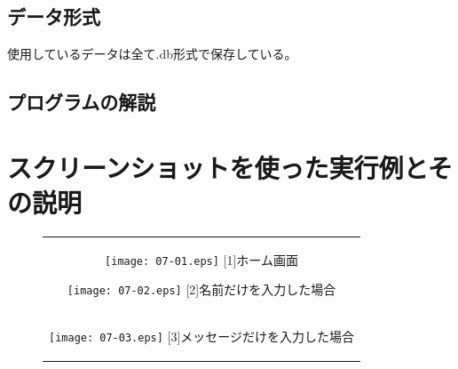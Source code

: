 \documentclass[12pt,a4paper]{jarticle}
\begin{document}
\begin{ttfamily}
\subsection{データ形式}
使用しているデータは全て.db形式で保存している。
\subsection{プログラムの解説}
\subsubsection{}
\subsubsection{}
\subsubsection{}


\section{スクリーンショットを使った実行例とその説明}
\begin{figure}[htbp]
  \begin{center}
    \begin{tabular}{c}

      \begin{minipage}{0.53\hsize}
        \begin{center}
          \texttt{[image: 07-01.eps]}
          \hspace{1.6cm} [1]ホーム画面
        \end{center}
      \end{minipage}

      \begin{minipage}{0.53\hsize}
        \begin{center}
          \texttt{[image: 07-02.eps]}
          \hspace{1.6cm} [2]名前だけを入力した場合
        \end{center}
      \end{minipage}

      \begin{minipage}{0.55\hsize}
        \vspace{90mm}
      \end{minipage} \\
 
      \begin{minipage}{0.53\hsize}
        \begin{center}
          \texttt{[image: 07-03.eps]}
          \hspace{1.0cm} [3]メッセージだけを入力した場合
        \end{center}
      \end{minipage}


\end{tabular}
\end{center}
\end{figure}
\end{ttfamily}
\end{document}
